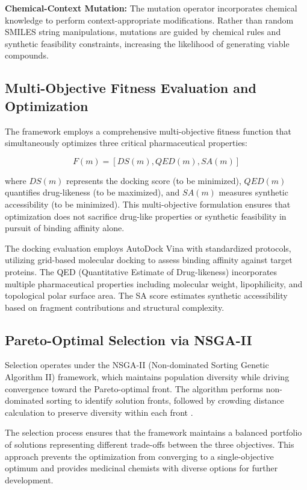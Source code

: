 \documentclass[lettersize,journal]{IEEEtran}
\begin{document}
\noindent \textbf{Chemical-Context Mutation:} The mutation operator incorporates chemical knowledge to perform context-appropriate modifications. Rather than random SMILES string manipulations, mutations are guided by chemical rules and synthetic feasibility constraints, increasing the likelihood of generating viable compounds.

\subsection{Multi-Objective Fitness Evaluation and Optimization}

The framework employs a comprehensive multi-objective fitness function that simultaneously optimizes three critical pharmaceutical properties:

\begin{equation}
F(m) = [DS(m), QED(m), SA(m)]
\end{equation}

where $DS(m)$ represents the docking score (to be minimized), $QED(m)$ quantifies drug-likeness (to be maximized), and $SA(m)$ measures synthetic accessibility (to be minimized). This multi-objective formulation ensures that optimization does not sacrifice drug-like properties or synthetic feasibility in pursuit of binding affinity alone.

The docking evaluation employs AutoDock Vina with standardized protocols, utilizing grid-based molecular docking to assess binding affinity against target proteins. The QED (Quantitative Estimate of Drug-likeness) incorporates multiple pharmaceutical properties including molecular weight, lipophilicity, and topological polar surface area. The SA score estimates synthetic accessibility based on fragment contributions and structural complexity.

\subsection{Pareto-Optimal Selection via NSGA-II}

Selection operates under the NSGA-II (Non-dominated Sorting Genetic Algorithm II) framework, which maintains population diversity while driving convergence toward the Pareto-optimal front. The algorithm performs non-dominated sorting to identify solution fronts, followed by crowding distance calculation to preserve diversity within each front \cite{zhangDualStageDualPopulationAlgorithm2025}.

The selection process ensures that the framework maintains a balanced portfolio of solutions representing different trade-offs between the three objectives. This approach prevents the optimization from converging to a single-objective optimum and provides medicinal chemists with diverse options for further development.
\end{document}
